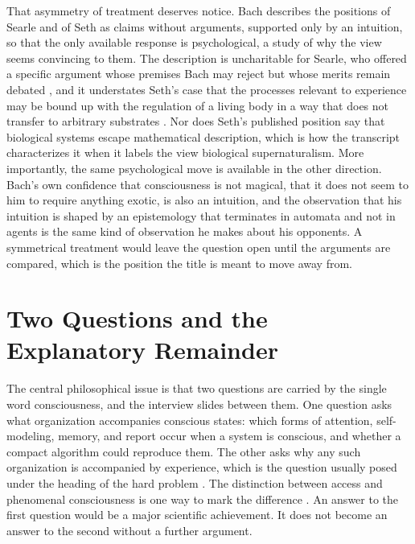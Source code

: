 \documentclass[11pt]{article}
\begin{document}
That asymmetry of treatment deserves notice. Bach describes the positions of Searle and of Seth as claims without arguments, supported only by an intuition, so that the only available response is psychological, a study of why the view seems convincing to them. The description is uncharitable for Searle, who offered a specific argument whose premises Bach may reject but whose merits remain debated \cite{searle1980}, and it understates Seth's case that the processes relevant to experience may be bound up with the regulation of a living body in a way that does not transfer to arbitrary substrates \cite{seth2021,seth2025}. Nor does Seth's published position say that biological systems escape mathematical description, which is how the transcript characterizes it when it labels the view biological supernaturalism. More importantly, the same psychological move is available in the other direction. Bach's own confidence that consciousness is not magical, that it does not seem to him to require anything exotic, is also an intuition, and the observation that his intuition is shaped by an epistemology that terminates in automata and not in agents is the same kind of observation he makes about his opponents. A symmetrical treatment would leave the question open until the arguments are compared, which is the position the title is meant to move away from.

\section{Two Questions and the Explanatory Remainder}

The central philosophical issue is that two questions are carried by the single word consciousness, and the interview slides between them. One question asks what organization accompanies conscious states: which forms of attention, self-modeling, memory, and report occur when a system is conscious, and whether a compact algorithm could reproduce them. The other asks why any such organization is accompanied by experience, which is the question usually posed under the heading of the hard problem \cite{chalmers1995,nagel1974,levine1983}. The distinction between access and phenomenal consciousness is one way to mark the difference \cite{block1995}. An answer to the first question would be a major scientific achievement. It does not become an answer to the second without a further argument.
\end{document}
